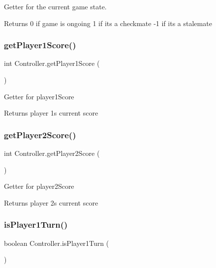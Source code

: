 Getter for the current game state. \begin{DoxyReturn}{Returns}
0 if game is ongoing 1 if it\textquotesingle{}s a checkmate -\/1 if it\textquotesingle{}s a stalemate 
\end{DoxyReturn}
\mbox{\label{class_controller_a2805b206f72e1c9c783c8077231180b1}} 
\subsubsection{\texorpdfstring{get\+Player1\+Score()}{getPlayer1Score()}}
{\footnotesize\ttfamily int Controller.\+get\+Player1\+Score (\begin{DoxyParamCaption}{ }\end{DoxyParamCaption})}

Getter for player1\+Score \begin{DoxyReturn}{Returns}
player 1\textquotesingle{}s current score 
\end{DoxyReturn}
\mbox{\label{class_controller_af537df2be96eb58fbd5c6866e7b0e32f}} 
\subsubsection{\texorpdfstring{get\+Player2\+Score()}{getPlayer2Score()}}
{\footnotesize\ttfamily int Controller.\+get\+Player2\+Score (\begin{DoxyParamCaption}{ }\end{DoxyParamCaption})}

Getter for player2\+Score \begin{DoxyReturn}{Returns}
player 2\textquotesingle{}s current score 
\end{DoxyReturn}
\mbox{\label{class_controller_a205f52396194c605eeee2db013d4cc1b}} 
\subsubsection{\texorpdfstring{is\+Player1\+Turn()}{isPlayer1Turn()}}
{\footnotesize\ttfamily boolean Controller.\+is\+Player1\+Turn (\begin{DoxyParamCaption}{ }\end{DoxyParamCaption})}


